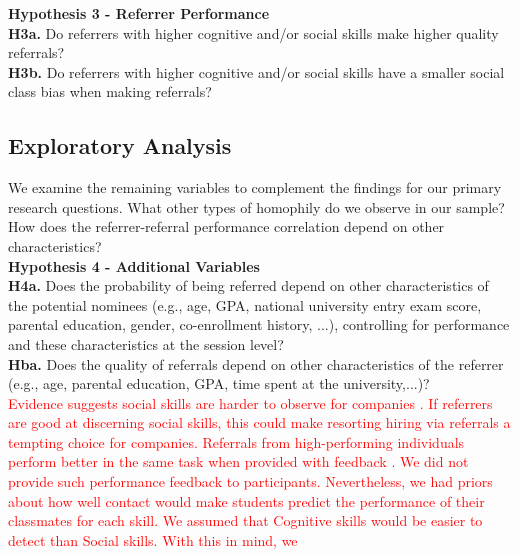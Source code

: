 \documentclass[11pt,a4paper,oneside]{article}
\begin{document}
\noindent\textbf{Hypothesis 3 - Referrer Performance}\\
\noindent\textbf{H3a.} Do referrers with higher cognitive and/or social skills make higher quality referrals?  \\
\noindent\textbf{H3b.} Do referrers with higher cognitive and/or social skills have a smaller social class bias when making referrals?

\subsection{Exploratory Analysis}
We examine the remaining variables to complement the findings for our primary research questions. What other types of homophily do we observe in our sample? How does the referrer-referral performance correlation depend on other characteristics?     \\

\noindent\textbf{Hypothesis 4 - Additional Variables}\\
\noindent\textbf{H4a.} Does the probability of being referred depend on other characteristics of the potential nominees (e.g., age, GPA, national university entry exam score, parental education, gender, co-enrollment history, ...), controlling for performance and these characteristics at the session level? \\
\noindent\textbf{Hba.} Does the quality of referrals depend on other characteristics of the referrer (e.g., age, parental education, GPA, time spent at the university,...)? \\

\textcolor{red}{Evidence suggests social skills are harder to observe for companies \citep{bassi2022screening}. If referrers are good at discerning social skills, this could make resorting hiring via referrals a tempting choice for companies.  Referrals from high-performing individuals perform better in the same task when provided with feedback \citep{beaman_who_2012, beaman_job_2018,pallais_why_2016}. We did not provide such performance feedback to participants. Nevertheless, we had priors about how well contact would make students predict the performance of their classmates for each skill. We assumed that Cognitive skills would be easier to detect than Social skills.  With this in mind, we }


\end{document}
